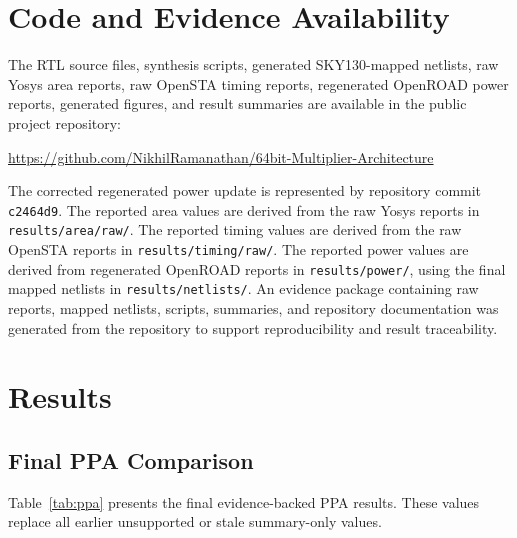 \documentclass[conference]{IEEEtran}
\begin{document}
\section{Code and Evidence Availability}
The RTL source files, synthesis scripts, generated SKY130-mapped netlists, raw Yosys area reports, raw OpenSTA timing reports, regenerated OpenROAD power reports, generated figures, and result summaries are available in the public project repository:

\begin{center}
\url{https://github.com/NikhilRamanathan/64bit-Multiplier-Architecture}
\end{center}

The corrected regenerated power update is represented by repository commit \texttt{c2464d9}. The reported area values are derived from the raw Yosys reports in \texttt{results/area/raw/}. The reported timing values are derived from the raw OpenSTA reports in \texttt{results/timing/raw/}. The reported power values are derived from regenerated OpenROAD reports in \texttt{results/power/}, using the final mapped netlists in \texttt{results/netlists/}. An evidence package containing raw reports, mapped netlists, scripts, summaries, and repository documentation was generated from the repository to support reproducibility and result traceability.

\section{Results}

\subsection{Final PPA Comparison}
Table~\ref{tab:ppa} presents the final evidence-backed PPA results. These values replace all earlier unsupported or stale summary-only values.

\begin{table}[t]
\centering
\caption{Final Evidence-Backed PPA Comparison}
\label{tab:ppa}
\scriptsize
{}
\end{table}
\end{document}
